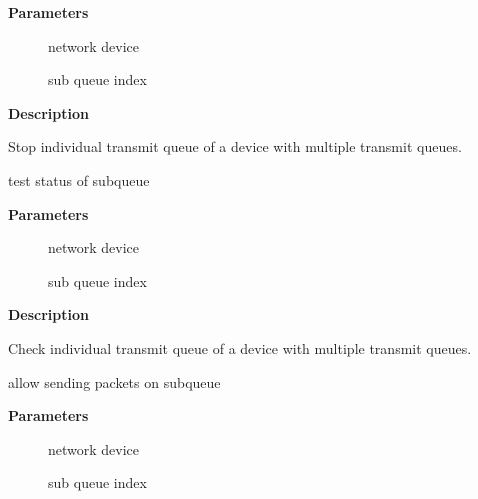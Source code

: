 \documentclass[a4paper,8pt,english]{sphinxmanual}
\begin{document}
\textbf{Parameters}
\begin{description}
\item[{}] \leavevmode
network device

\item[{}] \leavevmode
sub queue index

\end{description}

\textbf{Description}

Stop individual transmit queue of a device with multiple transmit queues.

\begin{fulllineitems}
\label{networking/kapi:c.__netif_subqueue_stopped}
test status of subqueue

\end{fulllineitems}


\textbf{Parameters}
\begin{description}
\item[{}] \leavevmode
network device

\item[{}] \leavevmode
sub queue index

\end{description}

\textbf{Description}

Check individual transmit queue of a device with multiple transmit queues.

\begin{fulllineitems}
\label{networking/kapi:c.netif_wake_subqueue}
allow sending packets on subqueue

\end{fulllineitems}


\textbf{Parameters}
\begin{description}
\item[{}] \leavevmode
network device

\item[{}] \leavevmode
sub queue index

\end{description}
\end{document}
